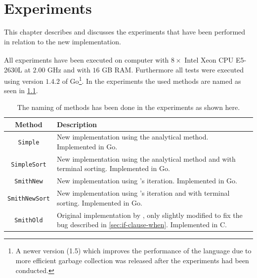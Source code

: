 {
\abnormalparskip{0pt}
\chapter{Experiments}
\label{cha:experiments}
}

This chapter describes and discusses the experiments that have been performed in
relation to the new implementation.

All experiments have been executed on computer with $8 \times$
Intel\textsuperscript{\textregistered} Xeon\textsuperscript{\textregistered} CPU
E5-2630L at $2.00$ GHz and with $16$ GB RAM. Furthermore all tests were executed
using version $1.4.2$ of Go\footnote{A newer version (1.5) which improves the performance of
  the language due to more efficient garbage collection was released after the
  experiments had been conducted.}. In the experiments the used methods are
named as seen in \cref{tab:method-names}.

\begin{table}[htbp]
  \centering
  \begin{tabular}{cp{9cm}}
    \toprule
    Method                & Description                                                                                                                                      \\
    \midrule
    \texttt{Simple}       & New implementation using the analytical method. Implemented in Go.                                                                               \\
    \texttt{SimpleSort}   & New implementation using the analytical method and with terminal sorting. Implemented in Go.                                                     \\
    \texttt{SmithNew}     & New implementation using \citeauthor{smith1992}'s iteration. Implemented in Go.                                                                  \\
    \texttt{SmithNewSort} & New implementation using \citeauthor{smith1992}'s iteration and with terminal sorting. Implemented in Go.                                        \\
    \texttt{SmithOld}     & Original implementation by \textcite{smith1992}, only slightly modified to fix the bug described in \cref{sec:if-clause-when}. Implemented in C. \\
    \bottomrule
  \end{tabular}
  \caption[Naming of methods]{The naming of methods has been done in the
    experiments as shown here.\label{tab:method-names}}
\end{table}

